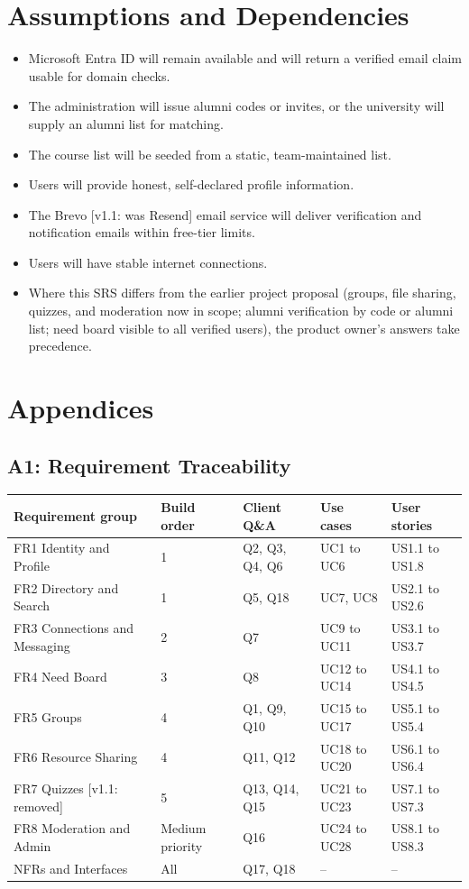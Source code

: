 \documentclass[10pt,a4paper]{article}
\newcommand{\vone}[1]{\textcolor{accent}{\small[v1.1: #1]}}
\begin{document}
\section{Assumptions and Dependencies}
\begin{itemize}
\item Microsoft Entra ID will remain available and will return a verified email claim usable for domain checks.
\item The administration will issue alumni codes or invites, or the university will supply an alumni list for matching.
\item The course list will be seeded from a static, team-maintained list.
\item Users will provide honest, self-declared profile information.
\item The Brevo \vone{was Resend} email service will deliver verification and notification emails within free-tier limits.
\item Users will have stable internet connections.
\item Where this SRS differs from the earlier project proposal (groups, file sharing, quizzes, and moderation now in scope; alumni verification by code or alumni list; need board visible to all verified users), the product owner's answers take precedence.
\end{itemize}

\section{Appendices}
\subsection*{A1: Requirement Traceability}
{\small
\begin{tabularx}{\linewidth}{@{}>{\raggedright\arraybackslash}p{38mm} l l l >{\raggedright\arraybackslash}X@{}}
\toprule
\textbf{Requirement group} & \textbf{Build order} & \textbf{Client Q\&A} & \textbf{Use cases} & \textbf{User stories}\\\midrule
FR1 Identity and Profile & 1 & Q2, Q3, Q4, Q6 & UC1 to UC6 & US1.1 to US1.8\\
FR2 Directory and Search & 1 & Q5, Q18 & UC7, UC8 & US2.1 to US2.6\\
FR3 Connections and Messaging & 2 & Q7 & UC9 to UC11 & US3.1 to US3.7\\
FR4 Need Board & 3 & Q8 & UC12 to UC14 & US4.1 to US4.5\\
FR5 Groups & 4 & Q1, Q9, Q10 & UC15 to UC17 & US5.1 to US5.4\\
FR6 Resource Sharing & 4 & Q11, Q12 & UC18 to UC20 & US6.1 to US6.4\\
FR7 Quizzes \vone{removed} & 5 & Q13, Q14, Q15 & UC21 to UC23 & US7.1 to US7.3\\
FR8 Moderation and Admin & Medium priority & Q16 & UC24 to UC28 & US8.1 to US8.3\\
NFRs and Interfaces & All & Q17, Q18 & -- & --\\
\bottomrule
\end{tabularx}}
\end{document}
